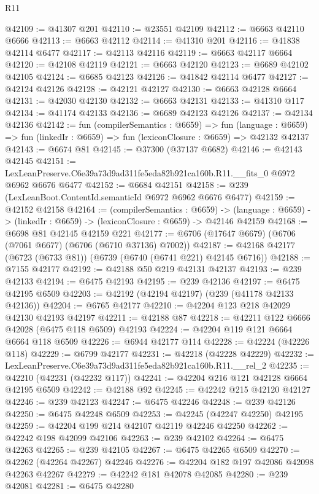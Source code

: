 \begin{lexlean}{R11}
\begin{coremodule}
@42109 := @41307 @201
@42110 := @23551 @42109
@42112 := @6663 @42110 @6666
@42113 := @6663 @42112
@42114 := @41310 @201
@42116 := @41838 @42114 @6477
@42117 := @42113 @42116
@42119 := @6663 @42117 @6664
@42120 := @42108 @42119
@42121 := @6663 @42120
@42123 := @6689 @42102 @42105
@42124 := @6685 @42123
@42126 := @41842 @42114 @6477
@42127 := @42124 @42126
@42128 := @42121 @42127
@42130 := @6663 @42128 @6664
@42131 := @42030 @42130
@42132 := @6663 @42131
@42133 := @41310 @117
@42134 := @41174 @42133
@42136 := @6689 @42123 @42126
@42137 := @42134 @42136
@42142 := fun (compilerSemantics : @6659) =>
  fun (language : @6659) => fun (linkedIr : @6659) => fun (lexiconClosure : @6659) => @42132 @42137
@42143 := @6674 @81
@42145 := @37300 (@37137 @6682)
@42146 := @42143 @42145
@42151 := LexLeanPreserve.C6e39a73d9ad311fe5eda82b921ca160b.R11.__fits_0 @6972 @6962 @6676 @6477
@42152 := @6684 @42151
@42158 := @239 (LexLeanBoot.ContentId.semanticId @6972 @6962 @6676 @6477)
@42159 := @42152 @42158
@42164 := (compilerSemantics : @6659) ->
  (language : @6659) -> (linkedIr : @6659) -> (lexiconClosure : @6659) -> @42146 @42159
@42168 := @6698 @81 @42145 @42159 @221
@42177 := @6706 (@17647 @6679) (@6706 (@7061 @6677) (@6706 (@6710 @37136) @7002))
@42187 := @42168 @42177 (@6723 (@6733 @81)) (@6739 (@6740 (@6741 @221) @42145 @6716))
@42188 := @7155 @42177
@42192 := @42188 @50 @219 @42131 @42137
@42193 := @239 @42133
@42194 := @6475 @42193
@42195 := @239 @42136
@42197 := @6475 @42195 @6509
@42203 := @42192 (@42194 @42197) (@239 (@41178 @42133 @42136))
@42204 := @6765 @42177
@42210 := @42204 @123 @218 @42029 @42130 @42193 @42197
@42211 := @42188 @87
@42218 := @42211 @122 @6666 @42028 (@6475 @118 @6509) @42193
@42224 := @42204 @119 @121 @6664 @6664 @118 @6509
@42226 := @6944 @42177 @114
@42228 := @42224 (@42226 @118)
@42229 := @6799 @42177
@42231 := @42218 (@42228 @42229)
@42232 := LexLeanPreserve.C6e39a73d9ad311fe5eda82b921ca160b.R11.__rel_2
@42235 := @42210 (@42231 (@42232 @117))
@42241 := @42204 @216 @121 @42128 @6664 @42195 @6509
@42242 := @42188 @92
@42245 := @42242 @215 @42120 @42127
@42246 := @239 @42123
@42247 := @6475 @42246
@42248 := @239 @42126
@42250 := @6475 @42248 @6509
@42253 := @42245 (@42247 @42250) @42195
@42259 := @42204 @199 @214 @42107 @42119 @42246 @42250
@42262 := @42242 @198 @42099 @42106
@42263 := @239 @42102
@42264 := @6475 @42263
@42265 := @239 @42105
@42267 := @6475 @42265 @6509
@42270 := @42262 (@42264 @42267) @42246
@42276 := @42204 @182 @197 @42086 @42098 @42263 @42267
@42279 := @42242 @181 @42078 @42085
@42280 := @239 @42081
@42281 := @6475 @42280

\end{coremodule}
\end{lexlean}
